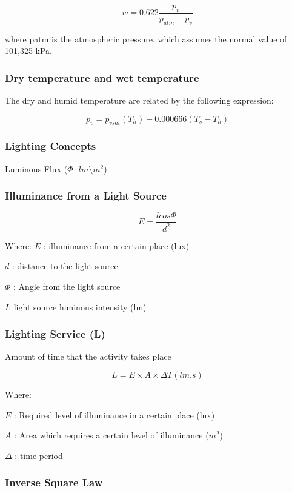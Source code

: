 \documentclass[]{book}
\theoremstyle{definition}
\theoremstyle{definition}
\theoremstyle{definition}
\theoremstyle{remark}
\begin{document}
\[w= 0.622\frac{p_{v}}{p_{atm}-p_{v}}\]

where patm is the atmospheric pressure, which assumes the normal value
of 101,325 kPa.

\subsubsection{Dry temperature and wet
temperature}\label{dry-temperature-and-wet-temperature}

The dry and humid temperature are related by the following expression:

\[p_{v} = p_{vsat}(T_h) - 0.000666(T_s-T_h)\]

\subsubsection{Lighting Concepts}\label{lighting-concepts}

Luminous Flux (\(\Phi\ : lm\setminus m^2\))

\subsubsection{Illuminance from a Light
Source}\label{illuminance-from-a-light-source}

\[E = \frac{lcos\Phi }{d^2}\]

Where: \(E\) : illuminance from a certain place (lux)

\(d\) : distance to the light source

\(\Phi\) : Angle from the light source

\(I\): light source luminous intensity (lm)

\subsubsection{Lighting Service (L)}\label{lighting-service-l}

Amount of time that the activity takes place

\[L = E\times A\times  \Delta T(lm. s)\]

Where:

\(E\) : Required level of illuminance in a certain place (lux)

\(A\) : Area which requires a certain level of illuminance (\(m^2\))

\(\Delta\) : time period

\subsubsection{Inverse Square Law}\label{inverse-square-law}
\end{document}
